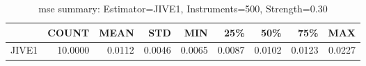 \begin{table}[ht]
\centering
\caption{mse summary: Estimator=JIVE1, Instruments=500, Strength=0.30}
\begin{tabular}{lrrrrrrrr}
\toprule
 & COUNT & MEAN & STD & MIN & 25\% & 50\% & 75\% & MAX \\
\midrule
JIVE1 & 10.0000 & 0.0112 & 0.0046 & 0.0065 & 0.0087 & 0.0102 & 0.0123 & 0.0227 \\
\bottomrule
\end{tabular}
\end{table}
